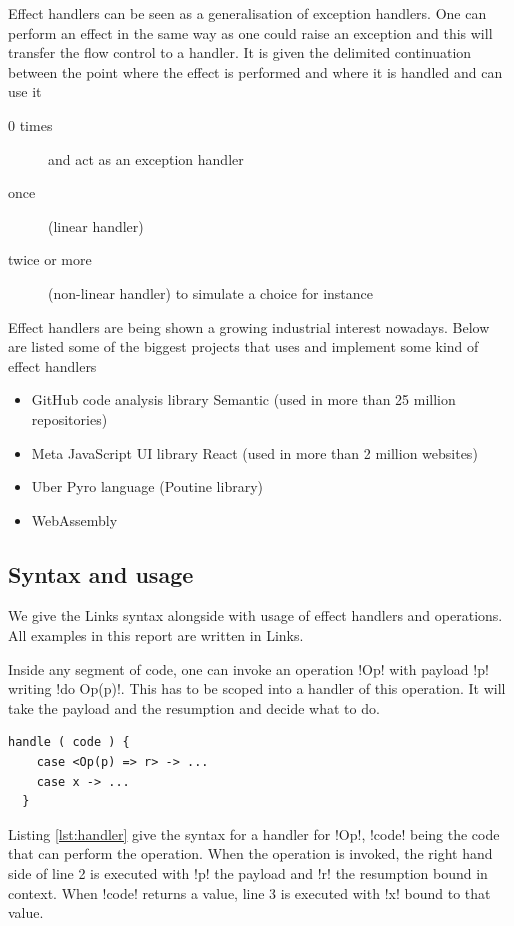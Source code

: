 \documentclass[10pt, nonacm=true, language=french, language=english]{acmart}
\begin{document}
Effect handlers can be seen as a generalisation of exception handlers. One can perform an effect in the same way as one could raise an exception and this will transfer the flow control to a handler. It is given the delimited continuation between the point where the effect is performed and where it is handled and can use it
\begin{description}
  \item[0 times] and act as an exception handler
  \item[once] (linear handler)
  \item[twice or more] (non-linear handler) to simulate a choice for instance
\end{description}

Effect handlers are being shown a growing industrial interest nowadays. Below are listed some of the biggest projects that uses and implement some kind of effect handlers
\begin{itemize}
  \item GitHub code analysis library Semantic (used in more than 25 million repositories)
  \item Meta JavaScript UI library React (used in more than 2 million websites)
  \item Uber Pyro language (Poutine library) \cite{pyro, pyro-poutine}
  \item WebAssembly \cite{wasmfx}
\end{itemize}

\subsection{Syntax and usage}

We give the Links syntax alongside with usage of effect handlers and operations. All examples in this report are written in Links.

Inside any segment of code, one can invoke an operation !Op! with payload !p! writing !do Op(p)!. This has to be scoped into a handler of this operation. It will take the payload and the resumption and decide what to do.

\begin{lstlisting}[caption=Handler,label=lst:handler]
  handle ( code ) {
    case <Op(p) => r> -> ...
    case x -> ...
  }
\end{lstlisting}

Listing \ref{lst:handler} give the syntax for a handler for !Op!, !code! being the code that can perform the operation. When the operation is invoked, the right hand side of line 2 is executed with !p! the payload and !r! the resumption bound in context. When !code! returns a value, line 3 is executed with !x! bound to that value.
\end{document}
